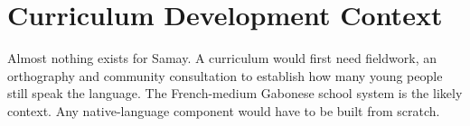 \documentclass[12pt]{article}
\begin{document}
\section{Curriculum Development Context}
Almost nothing exists for Samay. A curriculum would first need fieldwork, an orthography and community consultation to establish how many young people still speak the language. The French-medium Gabonese school system is the likely context. Any native-language component would have to be built from scratch.
\end{document}
